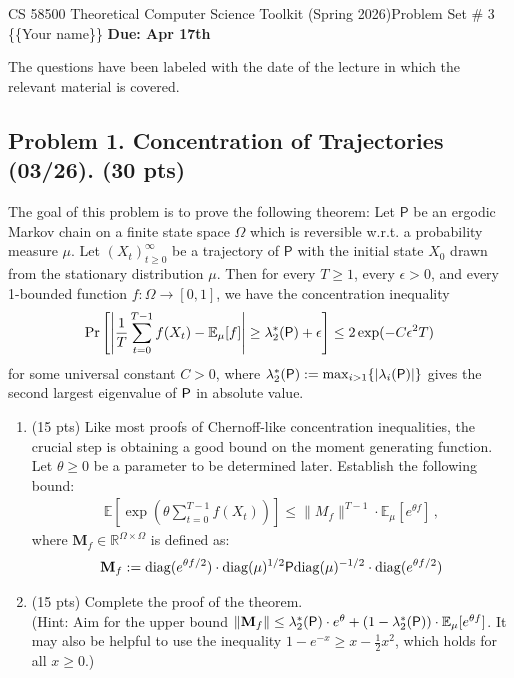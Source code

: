 \documentclass[12pt]{article}
\theoremstyle{plain}
\theoremstyle{definition}
\newcommand{\mat}[1]{\mathbf{#1}}
\begin{document}
\noindent CS 58500 Theoretical Computer Science Toolkit (Spring 2026)\hfill Problem Set \# 3\\
\{\{Your name\}\} \hfill \textbf{Due: Apr 17th}

\noindent\hrulefill

The questions have been labeled with the date of the lecture in which the relevant material is covered.


\subsection*{Problem 1. Concentration of Trajectories (03/26). (30 pts)}

The goal of this problem is to prove the following theorem: Let $\mathsf{P}$ be an ergodic Markov chain on a finite state space $\Omega$ which is reversible w.r.t. a probability measure $\mu$. Let $(X_t)_{t\geq 0}^\infty$ be a trajectory of $\mathsf{P}$ with the initial state $X_0$ drawn from the stationary distribution $\mu$. Then for every $T\geq 1$, every $\epsilon>0$, and every 1-bounded function $f: \Omega\rightarrow [0, 1]$, we have the concentration inequality 
\begin{align*}
    \Pr\left[\left|\frac{1}{T}\sum_{t=0}^{T-1} f(X_t)-\mathbb{E}_\mu[f]\right|\geq \lambda_2^*({\sf P}) + \epsilon\right]\leq 2\exp(-C\epsilon^2 T)
\end{align*}
for some universal constant $C>0$, where $\lambda_2^*({\sf P}):=\max_{i>1} \{|\lambda_i({\sf P})|\}$ gives the second largest
eigenvalue of ${\sf P}$ in absolute value.

\begin{enumerate}
    \item (15 pts) Like most proofs of Chernoff-like concentration inequalities, the crucial step is obtaining a good bound on the moment generating function. Let $\theta\geq 0$ be a parameter to be determined later. Establish the following bound:
    \begin{align*}
        \mathbb{E}\left[\exp\left(\theta \sum_{t=0}^{T-1} f(X_t)\right)\right]\leq \|M_f\|^{T-1} \cdot \mathbb{E}_\mu[e^{\theta f}]\,,
    \end{align*}
    where $\mat{M}_f\in \mathbb{R}^{\Omega\times \Omega}$ is defined as:
    \begin{align*}
        \mat{M}_f:={\rm diag}(e^{\theta f/2}) \cdot {\rm diag}(\mu)^{1/2}{\sf P}{\rm diag}(\mu)^{-1/2}\cdot {\rm diag}(e^{\theta f/2})
    \end{align*}
    \item (15 pts) Complete the proof of the theorem.\\
    (Hint: Aim for the upper bound $\|\mat{M}_f\|\leq \lambda_2^*({\sf P}) \cdot e^{\theta} + (1-\lambda_2^*({\sf P})) \cdot \mathbb{E}_\mu[e^{\theta f}]$. It may also be helpful to use the inequality $1 - e^{-x} \geq x - \frac{1}{2}x^2$, which holds for all $x\geq 0$.)
\end{enumerate}
\end{document}
